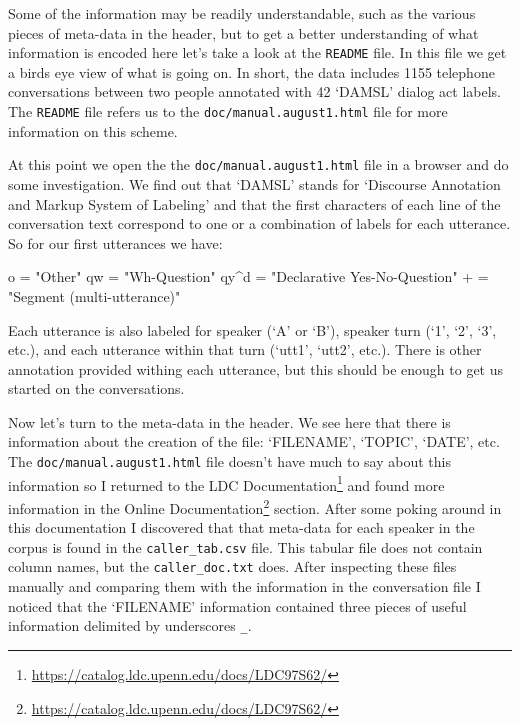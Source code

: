\documentclass[
]{article}
\newenvironment{Shaded}{\begin{snugshade}}{\end{snugshade}}
\newcommand{\NormalTok}[1]{#1}
\DeclareRobustCommand{\href}[2]{#2\footnote{\url{#1}}}
\begin{document}
Some of the information may be readily understandable, such as the various pieces of meta-data in the header, but to get a better understanding of what information is encoded here let's take a look at the \texttt{README} file. In this file we get a birds eye view of what is going on. In short, the data includes 1155 telephone conversations between two people annotated with 42 `DAMSL' dialog act labels. The \texttt{README} file refers us to the \texttt{doc/manual.august1.html} file for more information on this scheme.

At this point we open the the \texttt{doc/manual.august1.html} file in a browser and do some investigation. We find out that `DAMSL' stands for `Discourse Annotation and Markup System of Labeling' and that the first characters of each line of the conversation text correspond to one or a combination of labels for each utterance. So for our first utterances we have:

\begin{Shaded}
\begin{Highlighting}[]
\NormalTok{o = "Other"}
\NormalTok{qw = "Wh{-}Question"}
\NormalTok{qy\^{}d = "Declarative Yes{-}No{-}Question"}
\NormalTok{+ = "Segment (multi{-}utterance)"}
\end{Highlighting}
\end{Shaded}

Each utterance is also labeled for speaker (`A' or `B'), speaker turn (`1', `2', `3', etc.), and each utterance within that turn (`utt1', `utt2', etc.). There is other annotation provided withing each utterance, but this should be enough to get us started on the conversations.

Now let's turn to the meta-data in the header. We see here that there is information about the creation of the file: `FILENAME', `TOPIC', `DATE', etc. The \texttt{doc/manual.august1.html} file doesn't have much to say about this information so I returned to the \href{https://catalog.ldc.upenn.edu/docs/LDC97S62/}{LDC Documentation} and found more information in the \href{https://catalog.ldc.upenn.edu/docs/LDC97S62/}{Online Documentation} section. After some poking around in this documentation I discovered that that meta-data for each speaker in the corpus is found in the \texttt{caller\_tab.csv} file. This tabular file does not contain column names, but the \texttt{caller\_doc.txt} does. After inspecting these files manually and comparing them with the information in the conversation file I noticed that the `FILENAME' information contained three pieces of useful information delimited by underscores \texttt{\_}.
\end{document}
